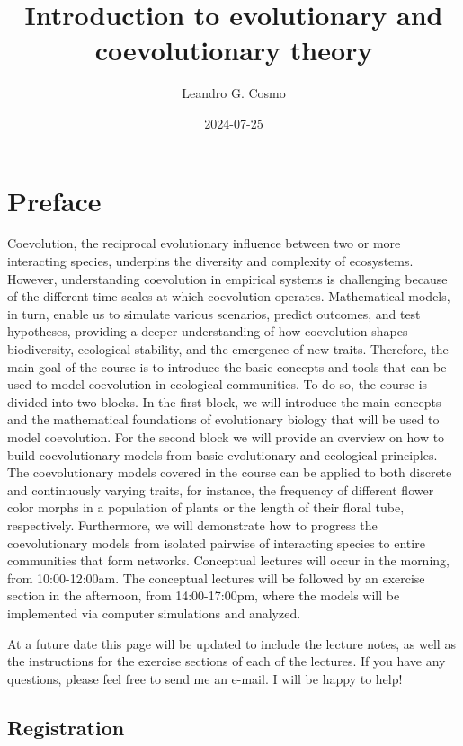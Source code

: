 \documentclass[
]{book}
\title{Introduction to evolutionary and coevolutionary theory}
\author{Leandro G. Cosmo}
\date{2024-07-25}
\begin{document}
\maketitle

{
\setcounter{tocdepth}{1}
\tableofcontents
}
\hypertarget{preface}{%
\chapter{Preface}\label{preface}}

Coevolution, the reciprocal evolutionary influence between two or more interacting species, underpins the diversity and complexity of ecosystems. However, understanding coevolution in empirical systems is challenging because of the different time scales at which coevolution operates. Mathematical models, in turn, enable us to simulate various scenarios, predict outcomes, and test hypotheses, providing a deeper understanding of how coevolution shapes biodiversity, ecological stability, and the emergence of new traits. Therefore, the main goal of the course is to introduce the basic concepts and tools that can be used to model coevolution in ecological communities. To do so, the course is divided into two blocks. In the first block, we will introduce the main concepts and the mathematical foundations of evolutionary biology that will be used to model coevolution. For the second block we will provide an overview on how to build coevolutionary models from basic evolutionary and ecological principles. The coevolutionary models covered in the course can be applied to both discrete and continuously varying traits, for instance, the frequency of different flower color morphs in a population of plants or the length of their floral tube, respectively. Furthermore, we will demonstrate how to progress the coevolutionary models from isolated pairwise of interacting species to entire communities that form networks. Conceptual lectures will occur in the morning, from 10:00-12:00am. The conceptual lectures will be followed by an exercise section in the afternoon, from 14:00-17:00pm, where the models will be implemented via computer simulations and analyzed.

At a future date this page will be updated to include the lecture notes, as well as the instructions for the exercise sections of each of the lectures. If you have any questions, please feel free to send me an e-mail. I will be happy to help!

\hypertarget{registration}{%
\section{Registration}\label{registration}}
\end{document}

